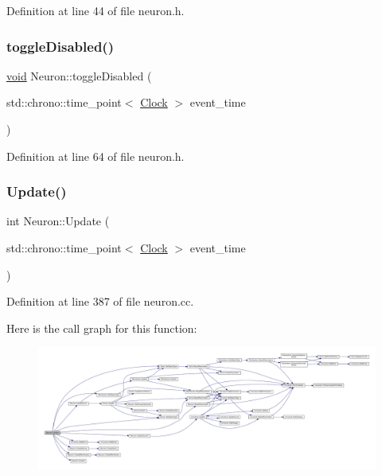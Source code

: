Definition at line 44 of file neuron.\+h.

\mbox{\label{class_neuron_a32fe82aa21f8a68392d696eea3a34c99}} 
\subsubsection{\texorpdfstring{toggle\+Disabled()}{toggleDisabled()}}
{\footnotesize\ttfamily \mbox{\hyperlink{glad_8h_a950fc91edb4504f62f1c577bf4727c29}{void}} Neuron\+::toggle\+Disabled (\begin{DoxyParamCaption}\item[{std\+::chrono\+::time\+\_\+point$<$ \mbox{\hyperlink{universe_8h_a0ef8d951d1ca5ab3cfaf7ab4c7a6fd80}{Clock}} $>$}]{event\+\_\+time }\end{DoxyParamCaption})\hspace{0.3cm}{\ttfamily [inline]}}



Definition at line 64 of file neuron.\+h.

\mbox{\label{class_neuron_a4d1dc3a9f30196fe2b09dfbfc0a567bb}} 
\subsubsection{\texorpdfstring{Update()}{Update()}}
{\footnotesize\ttfamily int Neuron\+::\+Update (\begin{DoxyParamCaption}\item[{std\+::chrono\+::time\+\_\+point$<$ \mbox{\hyperlink{universe_8h_a0ef8d951d1ca5ab3cfaf7ab4c7a6fd80}{Clock}} $>$}]{event\+\_\+time }\end{DoxyParamCaption})}



Definition at line 387 of file neuron.\+cc.

Here is the call graph for this function\+:\nopagebreak
\begin{figure}[H]
\begin{center}
\leavevmode
\includegraphics[width=350pt]{class_neuron_a4d1dc3a9f30196fe2b09dfbfc0a567bb_cgraph}
\end{center}
\end{figure}
\mbox{\label{class_neuron_a06f45a5d1de890da84d3644fe58ea0a9}} 
